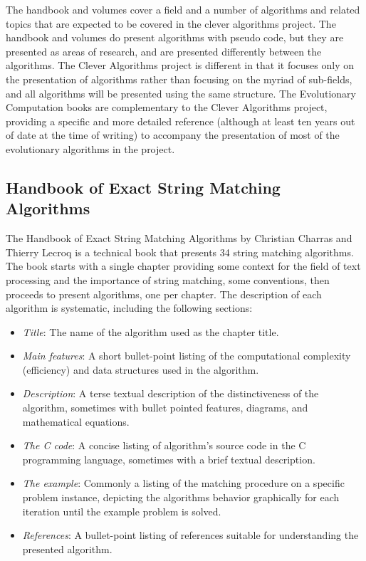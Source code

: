 \documentclass[a4paper, 11pt]{article}
\begin{document}
The handbook and volumes cover a field and a number of algorithms and related topics that are expected to be covered in the clever algorithms project. The handbook and volumes do present algorithms with pseudo code, but they are presented as areas of research, and are presented differently between the algorithms. The Clever Algorithms project is different in that it focuses only on the presentation of algorithms rather than focusing on the myriad of sub-fields, and all algorithms will be presented using the same structure. The Evolutionary Computation books are complementary to the Clever Algorithms project, providing a specific and more detailed reference (although at least ten years out of date at the time of writing) to accompany the presentation of most of the evolutionary algorithms in the project.

% 
%  
\subsection{Handbook of Exact String Matching Algorithms}
\label{subsec:strings}
The Handbook of Exact String Matching Algorithms by Christian Charras and Thierry Lecroq \cite{Charras2004} is a technical book that presents 34 string matching algorithms. The book starts with a single chapter providing some context for the field of text processing and the importance of string matching, some conventions, then proceeds to present algorithms, one per chapter. The description of each algorithm is systematic, including the following sections:

\begin{itemize}
	\item \emph{Title}: The name of the algorithm used as the chapter title.
	\item \emph{Main features}: A short bullet-point listing of the computational complexity (efficiency) and data structures used in the algorithm.
	\item \emph{Description}: A terse textual description of the distinctiveness of the algorithm, sometimes with bullet pointed features, diagrams, and mathematical equations. 
	\item \emph{The C code}: A concise listing of algorithm's source code in the C programming language, sometimes with a brief textual description.
	\item \emph{The example}: Commonly a listing of the matching procedure on a specific problem instance, depicting the algorithms behavior graphically for each iteration until the example problem is solved.
	\item \emph{References}: A bullet-point listing of references suitable for understanding the presented algorithm.
\end{itemize}
\end{document}
